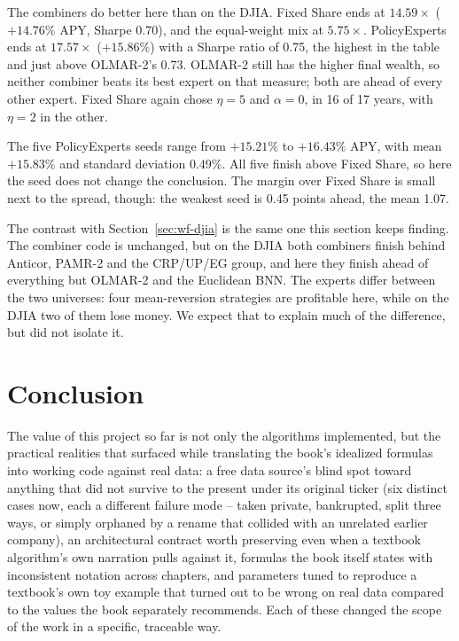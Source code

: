 \documentclass[11pt]{article}
\begin{document}
The combiners do better here than on the DJIA. Fixed Share ends at
$14.59\times$ ($+14.76\%$ APY, Sharpe 0.70), and the
equal-weight mix at $5.75\times$. PolicyExperts ends at $17.57\times$
($+15.86\%$) with a Sharpe ratio of 0.75, the highest in the table and
just above OLMAR-2's 0.73. OLMAR-2 still has the higher final wealth, so
neither combiner beats its best expert on that measure; both are ahead of
every other expert. Fixed Share again chose $\eta=5$ and $\alpha=0$,
in 16 of 17 years, with $\eta=2$ in the other.

The five PolicyExperts seeds range from $+15.21\%$ to $+16.43\%$ APY,
with mean $+15.83\%$ and standard deviation $0.49\%$. All five finish
above Fixed Share, so here the seed does
not change the conclusion. The margin over Fixed Share is small next to the
spread, though: the weakest seed is 0.45 points ahead, the mean 1.07.

The contrast with Section~\ref{sec:wf-djia} is the same one this section
keeps finding. The combiner code is unchanged, but on the DJIA both
combiners finish behind Anticor, PAMR-2 and the CRP/UP/EG group, and here
they finish ahead of everything but OLMAR-2 and the Euclidean BNN. The experts differ between
the two universes: four mean-reversion strategies are profitable here,
while on the DJIA two of them lose money. We expect that to explain much of the
difference, but did not isolate it.

\section{Conclusion}

The value of this project so far is not only the algorithms implemented,
but the practical realities that surfaced while translating the book's
idealized formulas into working code against real data: a free data
source's blind spot toward anything that did not survive to the present
under its original ticker (six distinct cases now, each a different
failure mode -- taken private, bankrupted, split three ways, or simply
orphaned by a rename that collided with an unrelated earlier company),
an architectural contract worth preserving even when a textbook
algorithm's own narration pulls against it, formulas the book itself
states with inconsistent notation across chapters, and parameters tuned
to reproduce a textbook's own toy example that turned out to be wrong on
real data compared to the values the book separately recommends. Each of
these changed the scope of the work in a specific, traceable way.
\end{document}
